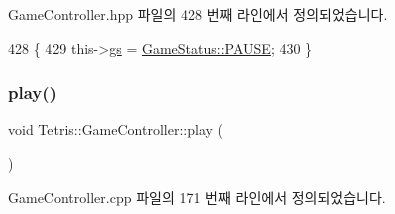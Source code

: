 Game\+Controller.\+hpp 파일의 428 번째 라인에서 정의되었습니다.


\begin{DoxyCode}
428                         \{
429                 this->\hyperlink{class_tetris_1_1_game_controller_ae4c894005a82404c73a5a9a6efb208dc}{gs} = \hyperlink{class_tetris_1_1_game_controller_a96a963b56385f3b3a122ff0ca2beb770a291554596c183e837f0a6bec3767c891}{GameStatus::PAUSE};
430             \}
\end{DoxyCode}
\mbox{\label{class_tetris_1_1_game_controller_a766a7537d955c62969f2e4b7c0b3c73d}} 
\subsubsection{\texorpdfstring{play()}{play()}\hspace{0.1cm}{\footnotesize\ttfamily [1/2]}}
{\footnotesize\ttfamily void Tetris\+::\+Game\+Controller\+::play (\begin{DoxyParamCaption}{ }\end{DoxyParamCaption})}



Game\+Controller.\+cpp 파일의 171 번째 라인에서 정의되었습니다.


